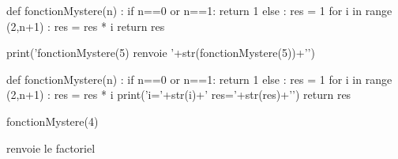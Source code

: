 \begin{minipage}{0.5\textwidth}

\begin{pycode}
def fonctionMystere(n) :
    if n==0 or n==1:
         return 1
    else :
        res = 1
    for i in range (2,n+1) :
        res = res * i
    return res

print('fonctionMystere(5) renvoie '+str(fonctionMystere(5))+'\n')
\end{pycode}
\end{minipage}
\begin{minipage}{0.5\textwidth}

\begin{pycode}
def fonctionMystere(n) :
    if n==0 or n==1:
         return 1
    else :
        res = 1
    for i in range (2,n+1) :
        res = res * i
        print('i='+str(i)+' res='+str(res)+'\n')
    return res

fonctionMystere(4)
\end{pycode}
\end{minipage}





 renvoie le factoriel